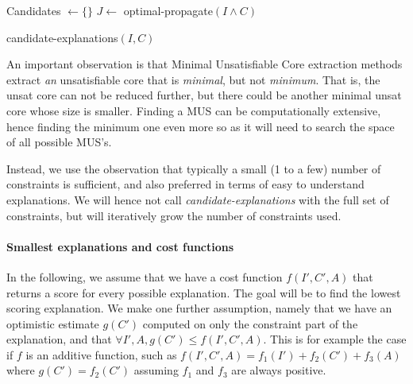 \begin{algorithm}
% 

% 

  Candidates $\gets \{\}$\;
  $J \gets$ optimal-propagate$(I \wedge C)$\;
\caption{candidate-explanations$(I,C)$}
\label{alg:cand}
\end{algorithm}

An important observation is that Minimal Unsatisfiable Core extraction methods extract \textit{an} unsatisfiable core that is \textit{minimal}, but not \textit{minimum}. That is, the unsat core can not be reduced further, but there could be another minimal unsat core whose size is smaller. Finding a MUS can be computationally extensive, hence finding the minimum one even more so as it will need to search the space of all possible MUS's.



Instead, we use the observation that typically a small (1 to a few) number of constraints is sufficient, and also preferred in terms of easy to understand explanations. We will hence not call \textit{candidate-explanations} with the full set of constraints, but will iteratively grow the number of constraints used.

\paragraph{Smallest explanations and cost functions}
In the following, we assume that we have a cost function $f(I', C', A)$ that returns a score for every possible explanation. The goal will be to find the lowest scoring explanation. We make one further assumption, namely that we have an optimistic estimate $g(C')$ computed on only the constraint part of the explanation, and that $\forall I', A, g(C') \leq f(I', C', A)$. This is for example the case if $f$ is an additive function, such as $f(I', C', A) = f_1(I') + f_2(C') + f_3(A)$ where $g(C') = f_2(C')$ assuming $f_1$ and $f_3$ are always positive.

